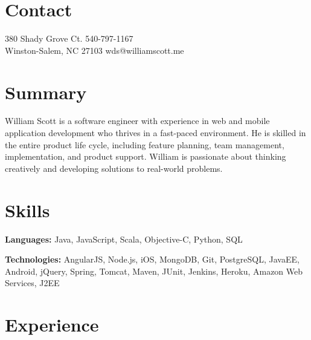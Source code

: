 \documentclass[margin,line]{resume}
\begin{document}
\begin{resume}
\vspace{-4mm}


  \section{\mysidestyle \textcolor{mySideColor}{Contact}}


  380 Shady Grove Ct. \hfill 540-797-1167 \\
  Winston-Salem, NC 27103 \hfill wds@williamscott.me



  \section{\mysidestyle \textcolor{mySideColor}{Summary}}

William Scott is a software engineer with experience in web and mobile
application development who thrives in a fast-paced environment. He is skilled
in the entire product life cycle, including feature planning, team management,
implementation, and product support. William is passionate about thinking
creatively and developing solutions to real-world problems.


  \section{\mysidestyle \textcolor{mySideColor}{Skills}}

  \textbf{Languages:} Java, JavaScript, Scala, Objective-C, Python, SQL
	\vspace{-2mm}

  \textbf{Technologies:} AngularJS, Node.js, iOS, MongoDB, Git, PostgreSQL, JavaEE, Android, jQuery, Spring, Tomcat, Maven, JUnit, Jenkins, Heroku, Amazon Web Services, J2EE
	\vspace{-2mm}


  \section{\mysidestyle \textcolor{mySideColor}{Experience}}


\end{resume}
\end{document}
